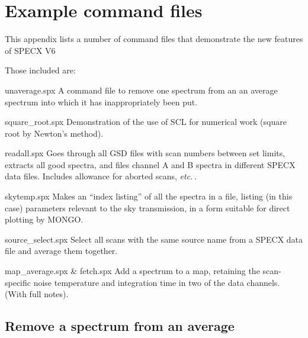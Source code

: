 \documentclass[11pt,twoside]{report}
\newcommand{\etc}{{\it etc.\,}}
\begin{document}
\newpage
\chapter{Example command files} 

This appendix lists a number of command files that demonstrate the new
features of SPECX V6

Those included are:
\begin{description}
\item{unaverage.spx} A command file to remove one spectrum from an an
       average spectrum into which it has inappropriately been put.
\item{square\_root.spx} Demonstration of the use of SCL for numerical
       work (square root by Newton's method).
\item{readall.spx} Goes through all GSD files with scan numbers between
       set limits, extracts all good spectra, and files channel A and B
       spectra in different SPECX data files. Includes allowance for
       aborted scans, \etc.
\item{skytemp.spx} Makes an ``index listing'' of all the spectra in a
       file, listing (in this case) parameters relevant to the sky
       transmission, in a form suitable for direct plotting by MONGO.
\item{source\_select.spx} Select all scans with the same source name from a
       SPECX data file and average them together.
\item{map\_average.spx \& fetch.spx} Add a spectrum to a map, retaining the
       scan-specific noise temperature and integration time in two of the
       data channels. (With full notes).
\end{description}

\newpage
\section{Remove a spectrum from an average}
\end{document}
